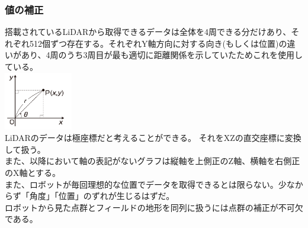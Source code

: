 \documentclass[dvipdfmx,a4paper]{jsarticle}
\begin{document}
    \subsubsection{値の補正}
    \noindent
    搭載されているLiDARから取得できるデータは全体を4周できる分だけあり、それぞれ512個ずつ存在する。それぞれY軸方向に対する向き(もしくは位置)の違いがあり、4周のうち3周目が最も適切に距離関係を示していたためこれを使用している。\\
    \includegraphics[width=30mm]{Photo/LiDAR/2.png}\\
    LiDARのデータは極座標だと考えることができる。
    それをXZの直交座標に変換して扱う。\\
    また、以降において軸の表記がないグラフは縦軸を上側正のZ軸、横軸を右側正のX軸とする。\\
    また、ロボットが毎回理想的な位置でデータを取得できるとは限らない。少なからず「角度」「位置」のずれが生じるはずだ。\\
    ロボットから見た点群とフィールドの地形を同列に扱うには点群の補正が不可欠である。\\
\end{document}
